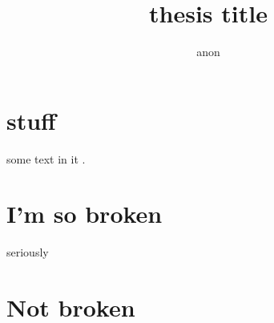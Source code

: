 \documentclass[11pt,Chicago]{uuthesis2e}
\title{thesis title}
\author{anon}
\begin{document}
\frontmatterformat
\titlepage
\copyrightpage
\committeeapproval
{}
\setcounter{tocdepth}{4}    %
\tableofcontents
\listoffigures
\listoftables
%
%
\maintext       %
%
%
%
%
%
%


\chapter{stuff}
some text in it
\citep{muller2013real}.

\chapter*{I'm so broken} 
seriously
\chapter{Not broken}

%
%
%
%

\def\newblock{\hskip .11em plus .33em minus .07em}



\end{document}
